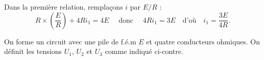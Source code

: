 
\begin{corrige}
	Dans la première relation, remplaçons $i$ par $E/R$ :
	\[
	R\times\left(\frac{E}{R}\right)+4Ri_1=4E
	\quad\text{ donc }\quad
	4Ri_1=3E	
	\quad\text{d'où}\quad
	i_1=\frac{3E}{4R}.
	\]
\end{corrige}


\finEntrainement











\hauteurLargeurCadreReponse		{10mm}{30mm}
\typeEntrainement				{} %
\initialisationEntrainement

                                \initialisationPartieGauche %
On forme un circuit avec une pile de f.é.m $E$ et quatre conducteurs ohmiques. On définit les tensions $U_1$, $U_2$ et $U_3$ comme indiqué ci-contre. 

